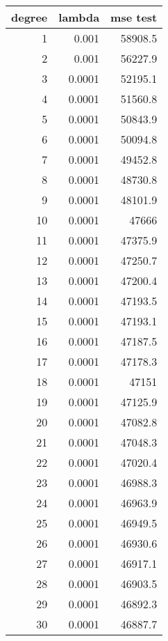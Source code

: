 \begin{tabular}{rrr}
\hline
   degree &   lambda &   mse test \\
\hline
        1 &   0.001  &    58908.5 \\
        2 &   0.001  &    56227.9 \\
        3 &   0.0001 &    52195.1 \\
        4 &   0.0001 &    51560.8 \\
        5 &   0.0001 &    50843.9 \\
        6 &   0.0001 &    50094.8 \\
        7 &   0.0001 &    49452.8 \\
        8 &   0.0001 &    48730.8 \\
        9 &   0.0001 &    48101.9 \\
       10 &   0.0001 &    47666   \\
       11 &   0.0001 &    47375.9 \\
       12 &   0.0001 &    47250.7 \\
       13 &   0.0001 &    47200.4 \\
       14 &   0.0001 &    47193.5 \\
       15 &   0.0001 &    47193.1 \\
       16 &   0.0001 &    47187.5 \\
       17 &   0.0001 &    47178.3 \\
       18 &   0.0001 &    47151   \\
       19 &   0.0001 &    47125.9 \\
       20 &   0.0001 &    47082.8 \\
       21 &   0.0001 &    47048.3 \\
       22 &   0.0001 &    47020.4 \\
       23 &   0.0001 &    46988.3 \\
       24 &   0.0001 &    46963.9 \\
       25 &   0.0001 &    46949.5 \\
       26 &   0.0001 &    46930.6 \\
       27 &   0.0001 &    46917.1 \\
       28 &   0.0001 &    46903.5 \\
       29 &   0.0001 &    46892.3 \\
       30 &   0.0001 &    46887.7 \\
\hline
\end{tabular}